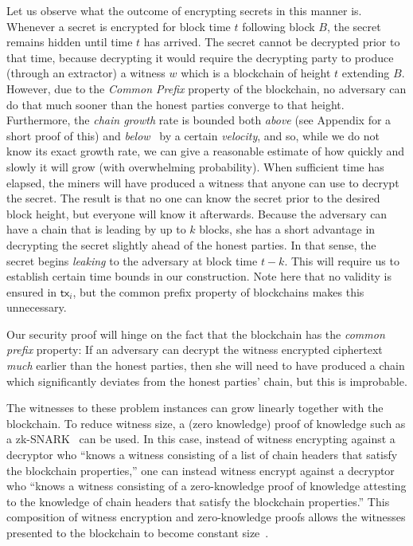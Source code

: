 Let us observe what the outcome of encrypting secrets in this manner is. Whenever a secret is encrypted
for block time $t$ following block $B$, the secret remains hidden until time $t$ has arrived.
The secret cannot be decrypted prior to that time, because decrypting it would require the decrypting party
to produce (through an extractor) a witness $w$ which is a blockchain of height $t$ extending $B$. However,
due to the \emph{Common Prefix} property of the blockchain, no adversary can do that much sooner than the
honest parties converge to that height. Furthermore, the \emph{chain growth} rate is bounded both \emph{above} (see
Appendix for a short proof of this)
and \emph{below}~\cite{backbone} by a certain \emph{velocity}, and so, while we do not know its exact growth rate, we can give
a reasonable estimate of how quickly and slowly it will grow (with overwhelming probability).
When sufficient time has elapsed, the miners will have produced a witness that anyone can use to decrypt the
secret. The result is that no one can know the secret prior to the desired block height, but everyone will
know it afterwards. Because the adversary can have a chain that is leading by up to $k$ blocks, she has
a short advantage in decrypting the secret slightly ahead of the honest parties. In that sense, the
secret begins \emph{leaking} to the adversary at block time $t - k$. This will require us to establish
certain time bounds in our construction.
Note here that no validity is ensured in $\textsf{tx}_i$, but the common prefix property of blockchains
makes this unnecessary.

Our security proof will hinge on the fact that the blockchain has the \emph{common prefix} property: If
an adversary can decrypt the witness encrypted ciphertext \emph{much} earlier than the honest parties,
then she will need to have produced a chain which significantly deviates from the honest parties' chain,
but this is improbable.

The witnesses to these problem instances can grow linearly together with the blockchain. To reduce witness
size, a (zero knowledge) proof of knowledge such as a zk-SNARK~\cite{EPRINT:BCTV13} can be used.
In this case, instead of
witness encrypting against a decryptor who
``knows a witness consisting of a list of chain headers that satisfy the blockchain properties,''
one can instead witness encrypt against a decryptor who
``knows a witness consisting of a zero-knowledge proof of knowledge attesting to the knowledge of chain headers
that satisfy the blockchain properties.'' This composition of witness encryption and zero-knowledge proofs
allows the witnesses presented to the blockchain to become constant size~\cite{timelock-bitcoin}.

